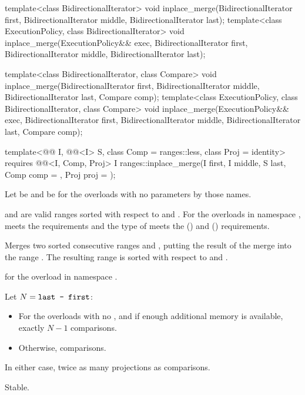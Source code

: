 %
\begin{itemdecl}
template<class BidirectionalIterator>
  void inplace_merge(BidirectionalIterator first,
                     BidirectionalIterator middle,
                     BidirectionalIterator last);
template<class ExecutionPolicy, class BidirectionalIterator>
  void inplace_merge(ExecutionPolicy&& exec,
                     BidirectionalIterator first,
                     BidirectionalIterator middle,
                     BidirectionalIterator last);

template<class BidirectionalIterator, class Compare>
  void inplace_merge(BidirectionalIterator first,
                     BidirectionalIterator middle,
                     BidirectionalIterator last, Compare comp);
template<class ExecutionPolicy, class BidirectionalIterator, class Compare>
  void inplace_merge(ExecutionPolicy&& exec,
                     BidirectionalIterator first,
                     BidirectionalIterator middle,
                     BidirectionalIterator last, Compare comp);

template<@@ I, @@<I> S, class Comp = ranges::less,
         class Proj = identity>
  requires @@<I, Comp, Proj>
  I ranges::inplace_merge(I first, I middle, S last, Comp comp = {}, Proj proj = {});
\end{itemdecl}

\begin{itemdescr}
\pnum
Let  be 
and  be 
for the overloads with no parameters by those names.

\pnum
\expects
{} and  are valid ranges
sorted with respect to  and .
For the overloads in namespace ,
 meets
the  requirements and
the type of  meets
the  () and
 () requirements.

\pnum
\effects
Merges two sorted consecutive ranges
 and ,
putting the result of the merge into the range .
The resulting range is sorted with respect to  and .

\pnum
\returns
{} for the overload in namespace .

\pnum
\complexity
Let $N = \texttt{last - first}$:
\begin{itemize}
\item
  For the overloads with no , and
  if enough additional memory is available, exactly $N - 1$ comparisons.
\item
  Otherwise,  comparisons.
\end{itemize}
In either case, twice as many projections as comparisons.

\pnum
\remarks
Stable.
\end{itemdescr}

